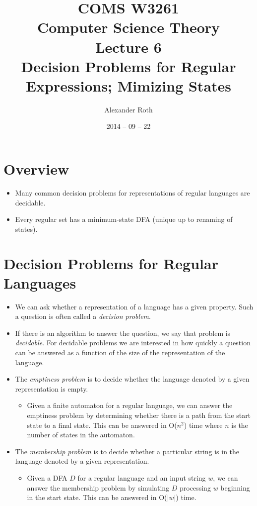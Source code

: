 \documentclass[]{article}
\begin{document}
\title{COMS W3261 \\ Computer Science Theory \\ Lecture 6\\ Decision Problems
for Regular Expressions; Mimizing States}
\author{Alexander Roth}
\date{2014 -- 09 -- 22}
\maketitle

\section*{Overview}
  \begin{itemize}
    \item Many common decision problems for representations of regular
    languages are decidable.
    \item Every regular set has a minimum-state DFA (unique up to renaming of
    states).
  \end{itemize}

\section{Decision Problems for Regular Languages}
  \begin{itemize}
    \item We can ask whether a representation of a language has a given
    property. Such a question is often called a \emph{decision problem}.
    \item If there is an algorithm to answer the question, we say that problem
    is \emph{decidable}. For decidable problems we are interested in how
    quickly a question can be answered as a function of the size of the
    representation of the language.
    \item The \emph{emptiness problem} is to decide whether the language
    denoted by a given representation is empty.
      \begin{itemize}
        \item Given a finite automaton for a regular language, we can answer
        the emptiness problem by determining whether there is a path from the
        start state to a final state. This can be answered in O($n^2$) time
        where $n$ is the number of states in the automaton.
      \end{itemize}
    \item The \emph{membership problem} is to decide whether a particular
    string is in the language denoted by a given representation.
      \begin{itemize}
        \item Given a DFA $D$ for a regular language and an input string $w$,
        we can answer the membership problem by simulating $D$ processing $w$
        beginning in the start state. This can be answered in O($|w|$) time.
      \end{itemize}
  \end{itemize}
\end{document}
